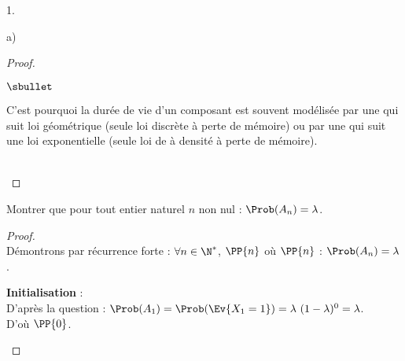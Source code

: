 \begin{noliste}{1.}
\begin{noliste}{a)}
\begin{proof}
\begin{remark}
\begin{noliste}{$\sbullet$}
        \item C'est pourquoi la durée de vie d'un composant est
          souvent modélisée par une \var qui suit loi géométrique
          (seule loi discrète à perte de mémoire) ou par une \var qui
          suit une loi exponentielle (seule loi de \var à densité à
          perte de mémoire). 
        \end{noliste}
      \end{remark}~\\[-1.4cm]
    \end{proof}

  \item Montrer que pour tout entier naturel $n$ non nul : $\Prob(A_n)
    = \lambda$.

    \begin{proof}~\\%
      Démontrons par récurrence forte : $\forall n \in \N^*$,
      $\PP{n}$ \quad où \quad $\PP{n}$ : $\Prob(A_n) = \lambda$.
      \begin{noliste}{\fitem}
      \item {\bf Initialisation} :\\
        D'après la question  : $\Prob(A_1) = \Prob(\Ev{ X_1
        = 1}) = \lambda \ (1 - \lambda)^0 = \lambda$.\\
      D'où $\PP{0}$.


\end{noliste}
\end{proof}
\end{noliste}
\end{noliste}
